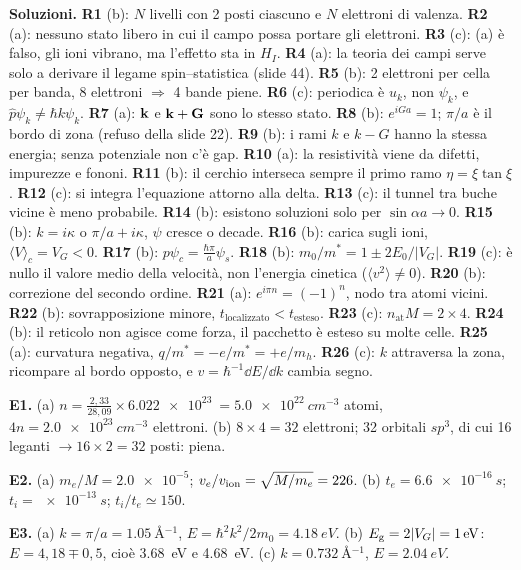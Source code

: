 \documentclass[11pt,a4paper]{article}
\begin{document}
\textbf{Soluzioni.}
\begingroup\small
\textbf{R1} (b): $N$ livelli con 2 posti ciascuno e $N$ elettroni di valenza. \textbf{R2} (a): nessuno stato libero in cui il campo possa portare gli
elettroni. \textbf{R3} (c): (a) è falso, gli ioni vibrano, ma l'effetto sta in $H_I$. \textbf{R4} (a): la teoria dei campi serve solo a derivare il legame
spin--statistica (slide 44). \textbf{R5} (b): 2 elettroni per cella per banda, 8 elettroni $\Rightarrow$ 4 bande piene. \textbf{R6} (c): periodica è $u_k$,
non $\psi_k$, e $\hat p\psi_k\ne\hbar k\psi_k$. \textbf{R7} (a): $\mathbf k$ e $\mathbf k+\mathbf G$ sono lo stesso stato. \textbf{R8} (b): $e^{iGa}=1$; $\pi/a$ è il bordo
di zona (refuso della slide 22). \textbf{R9} (b): i rami $k$ e $k-G$ hanno la stessa energia; senza potenziale non c'è gap. \textbf{R10} (a): la resistività viene da
difetti, impurezze e fononi. \textbf{R11} (b): il cerchio interseca sempre il primo ramo $\eta=\xi\tan\xi$. \textbf{R12} (c): si integra l'equazione attorno alla
delta. \textbf{R13} (c): il tunnel tra buche vicine è meno probabile. \textbf{R14} (b): esistono soluzioni solo per $\sin\alpha a\to0$. \textbf{R15} (b): $k=i\kappa$
o $\pi/a+i\kappa$, $\psi$ cresce o decade. \textbf{R16} (b): carica sugli ioni, $\langle V\rangle_c=V_G<0$. \textbf{R17} (b): $p\psi_c=\frac{\hbar\pi}a\psi_s$.
\textbf{R18} (b): $m_0/m^*=1\pm2E_0/|V_G|$. \textbf{R19} (c): è nullo il valore medio della velocità, non l'energia cinetica ($\langle v^2\rangle\ne0$).
\textbf{R20} (b): correzione del secondo ordine. \textbf{R21} (a): $e^{i\pi n}=(-1)^n$, nodo tra atomi vicini. \textbf{R22} (b): sovrapposizione minore,
$t_{\text{localizzato}}<t_{\text{esteso}}$. \textbf{R23} (c): $n_{\mathrm{at}}M=2\times4$. \textbf{R24} (b): il reticolo non agisce come forza, il pacchetto è esteso su
molte celle. \textbf{R25} (a): curvatura negativa, $q/m^*=-e/m^*=+e/m_h$. \textbf{R26} (c): $k$ attraversa la zona, ricompare al bordo opposto, e $v=\hbar^{-1}\dd E/\dd k$
cambia segno.

\smallskip\noindent\textbf{E1.} (a) $n=\frac{2{,}33}{28{,}09}\times\SI{6.022e23}{}=\SI{5.0e22}{cm^{-3}}$ atomi, $4n=\SI{2.0e23}{cm^{-3}}$ elettroni. (b) $8\times4=32$ elettroni; 32 orbitali $sp^3$, di cui 16 leganti $\to16\times2=32$ posti: piena.

\smallskip\noindent\textbf{E2.} (a) $m_e/M=\num{2.0e-5}$; $v_e/v_{\mathrm{ion}}=\sqrt{M/m_e}=226$. (b) $t_e=\SI{6.6e-16}{s}$; $t_i=\SI{e-13}{s}$; $t_i/t_e\simeq150$.

\smallskip\noindent\textbf{E3.} (a) $k=\pi/a=\SI{1.05}{\angstrom^{-1}}$, $E=\hbar^2k^2/2m_0=\SI{4.18}{eV}$. (b) $E_{\mathrm g}=2|V_G|=\SI{1}{eV}$: $E=4{,}18\mp0{,}5$, cioè \SI{3.68}{eV} e \SI{4.68}{eV}. (c) $k=\SI{0.732}{\angstrom^{-1}}$, $E=\SI{2.04}{eV}$.
\end{document}
